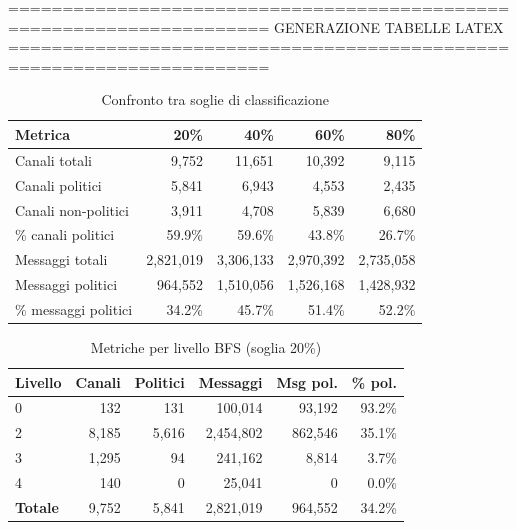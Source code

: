 ======================================================================
GENERAZIONE TABELLE LATEX
======================================================================


\begin{table}[htbp]
\centering
\caption{Confronto tra soglie di classificazione}
\label{tab:threshold_comparison}
\begin{tabular}{lrrrr}
\toprule
\textbf{Metrica} & \textbf{20\%} & \textbf{40\%} & \textbf{60\%} & \textbf{80\%} \\
\midrule
Canali totali & 9,752 & 11,651 & 10,392 & 9,115 \\
Canali politici & 5,841 & 6,943 & 4,553 & 2,435 \\
Canali non-politici & 3,911 & 4,708 & 5,839 & 6,680 \\
\% canali politici & 59.9\% & 59.6\% & 43.8\% & 26.7\% \\
\midrule
Messaggi totali & 2,821,019 & 3,306,133 & 2,970,392 & 2,735,058 \\
Messaggi politici & 964,552 & 1,510,056 & 1,526,168 & 1,428,932 \\
\% messaggi politici & 34.2\% & 45.7\% & 51.4\% & 52.2\% \\
\bottomrule
\end{tabular}
\end{table}



\begin{table}[htbp]
\centering
\caption{Metriche per livello BFS (soglia 20\%)}
\label{tab:levels_20}
\begin{tabular}{lrrrrr}
\toprule
\textbf{Livello} & \textbf{Canali} & \textbf{Politici} & \textbf{Messaggi} & \textbf{Msg pol.} & \textbf{\% pol.} \\
\midrule
0 & 132 & 131 & 100,014 & 93,192 & 93.2\% \\
2 & 8,185 & 5,616 & 2,454,802 & 862,546 & 35.1\% \\
3 & 1,295 & 94 & 241,162 & 8,814 & 3.7\% \\
4 & 140 & 0 & 25,041 & 0 & 0.0\% \\
\midrule
\textbf{Totale} & 9,752 & 5,841 & 2,821,019 & 964,552 & 34.2\% \\
\bottomrule
\end{tabular}
\end{table}


